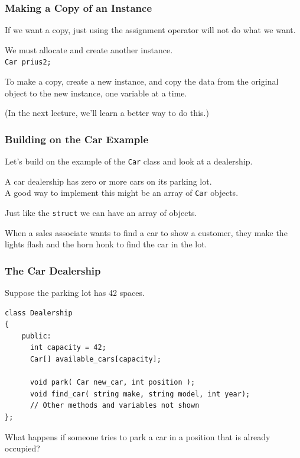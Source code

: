 \begin{frame}
\frametitle{Making a Copy of an Instance}

If we want a copy, just using the assignment operator will not do what we want.

We must allocate and create another instance.\\
\quad \texttt{Car prius2;}

To make a copy, create a new instance, and copy the data from the original object to the new instance, one variable at a time.

(In the next lecture, we'll learn a better way to do this.)

\end{frame}

\begin{frame}
\frametitle{Building on the Car Example}

Let's build on the example of the \texttt{Car} class and look at a dealership.

A car dealership has zero or more cars on its parking lot.\\
\quad A good way to implement this might be an array of \texttt{Car} objects.

Just like the \texttt{struct} we can have an array of objects.

When a sales associate wants to find a car to show a customer, they make the lights flash and the horn honk to find the car in the lot.

\end{frame}

\begin{frame}[fragile]
\frametitle{The Car Dealership}

Suppose the parking lot has 42 spaces.

\begin{verbatim}
class Dealership
{
    public:
      int capacity = 42;
      Car[] available_cars[capacity];

      void park( Car new_car, int position );
      void find_car( string make, string model, int year);
      // Other methods and variables not shown
};
\end{verbatim}

What happens if someone tries to park a car in a position that is already occupied?

\end{frame}


